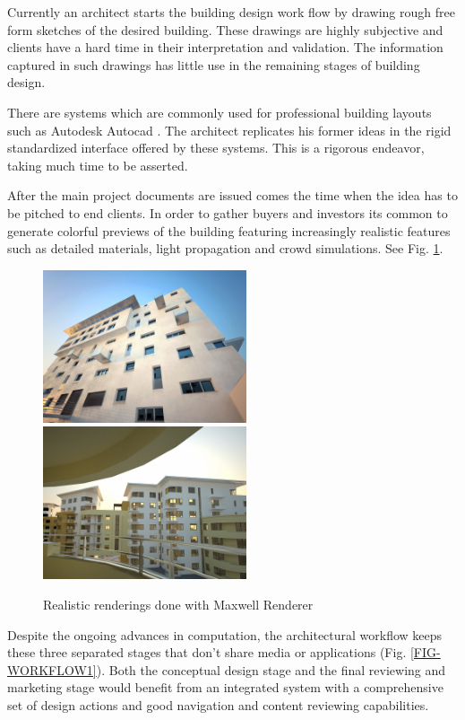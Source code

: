 Currently an architect starts the building design work flow by drawing rough
free form sketches of the desired building. These drawings are highly subjective
and clients have a hard time in their interpretation and validation.
The information captured in such drawings has little use in the remaining stages
of building design.


There are systems which are commonly used for professional building layouts
such as Autodesk Autocad \cite{SITE-AUTOCAD}.
The architect replicates his former ideas in the rigid standardized interface
offered by these systems. This is a rigorous endeavor, taking much time to be asserted.

After the main project documents are issued comes the time when the idea has to be pitched to end clients.
In order to gather buyers and investors its common to generate colorful previews of the building featuring increasingly realistic features such as detailed materials, light propagation and crowd simulations.
See Fig. \ref{FIG-REALISTIC}.

\begin{figure}[!ht]
	\centering
	\includegraphics[width=6cm]{gfx/realistic01.jpg}
	\includegraphics[width=6cm]{gfx/realistic03.jpg}
	\caption{Realistic renderings done with Maxwell Renderer}
	\label{FIG-REALISTIC}
\end{figure}

Despite the ongoing advances in computation, the architectural workflow keeps these three separated stages
that don't share media or applications (Fig. \ref{FIG-WORKFLOW1}).
Both the conceptual design stage and the final reviewing and marketing stage would benefit from 
an integrated system with a comprehensive set of design actions
and good navigation and content reviewing capabilities.

